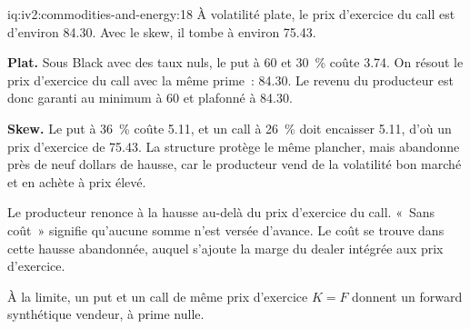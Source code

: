 \begin{solution}{iq:iv2:commodities-and-energy:18}
À volatilité plate, le prix d'exercice du call est d'environ 84.30. Avec le skew, il tombe à environ 75.43.

\textbf{Plat.} Sous Black avec des taux nuls, le put à 60 et 30~\% coûte 3.74. On résout le prix d'exercice du call avec la même prime~: 84.30. Le revenu du producteur est donc garanti au minimum à 60 et plafonné à 84.30.

\textbf{Skew.} Le put à 36~\% coûte 5.11, et un call à 26~\% doit encaisser 5.11, d'où un prix d'exercice de 75.43. La structure protège le même plancher, mais abandonne près de neuf dollars de hausse, car le producteur vend de la volatilité bon marché et en achète à prix élevé.

Le producteur renonce à la hausse au-delà du prix d'exercice du call. «~Sans coût~» signifie qu'aucune somme n'est versée d'avance. Le coût se trouve dans cette hausse abandonnée, auquel s'ajoute la marge du dealer intégrée aux prix d'exercice.

À la limite, un put et un call de même prix d'exercice $K = F$ donnent un forward synthétique vendeur, à prime nulle.

\end{solution}

